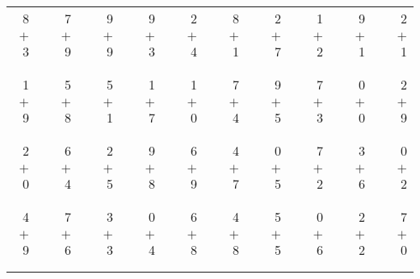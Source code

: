 \documentclass[12pt, letterpaper]{article}
\begin{document}
\begin{tabular}{rrrrrrrrrrrrrrrrrrr}
8 & & 7 & & 9 & & 9 & & 2 & & 8 & & 2 & & 1 & & 9 & & 2\\
$+$ 3 & & $+$ 9 & & $+$ 9 & & $+$ 3 & & $+$ 4 & & $+$ 1 & & $+$ 7 & & $+$ 2 & & $+$ 1 & & $+$ 1\\
\cline{1-1} \cline{3-3} \cline{5-5} \cline{7-7} \cline{9-9} \cline{11-11} \cline{13-13} \cline{15-15} \cline{17-17} \cline{19-19} \\ \\
1 & & 5 & & 5 & & 1 & & 1 & & 7 & & 9 & & 7 & & 0 & & 2\\
$+$ 9 & & $+$ 8 & & $+$ 1 & & $+$ 7 & & $+$ 0 & & $+$ 4 & & $+$ 5 & & $+$ 3 & & $+$ 0 & & $+$ 9\\
\cline{1-1} \cline{3-3} \cline{5-5} \cline{7-7} \cline{9-9} \cline{11-11} \cline{13-13} \cline{15-15} \cline{17-17} \cline{19-19} \\ \\
2 & & 6 & & 2 & & 9 & & 6 & & 4 & & 0 & & 7 & & 3 & & 0\\
$+$ 0 & & $+$ 4 & & $+$ 5 & & $+$ 8 & & $+$ 9 & & $+$ 7 & & $+$ 5 & & $+$ 2 & & $+$ 6 & & $+$ 2\\
\cline{1-1} \cline{3-3} \cline{5-5} \cline{7-7} \cline{9-9} \cline{11-11} \cline{13-13} \cline{15-15} \cline{17-17} \cline{19-19} \\ \\
4 & & 7 & & 3 & & 0 & & 6 & & 4 & & 5 & & 0 & & 2 & & 7\\
$+$ 9 & & $+$ 6 & & $+$ 3 & & $+$ 4 & & $+$ 8 & & $+$ 8 & & $+$ 5 & & $+$ 6 & & $+$ 2 & & $+$ 0\\
\cline{1-1} \cline{3-3} \cline{5-5} \cline{7-7} \cline{9-9} \cline{11-11} \cline{13-13} \cline{15-15} \cline{17-17} \cline{19-19} \\ \\
\end{tabular}
\newpage
\end{document}
